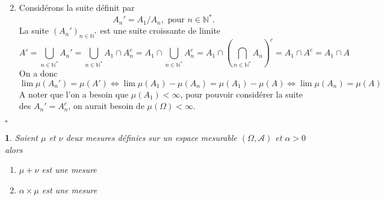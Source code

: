 \documentclass[8pt,notheorems]{beamer}
\newtheorem{prop}{\translate{Proposition}}
\theoremstyle{definition}
\theoremstyle{example}
\theoremstyle{mystyle}
\theoremstyle{plain}
\begin{document}
\begin{frame}[allowframebreaks]
\begin{enumerate}
$$$$
\item Considérons la suite définit par 
$$
A_n' = A_1 / A_n,\text{ pour }n\in \mathbb{N}^\ast.
$$
La suite $(A_n')_{n\in\mathbb{N}^\ast}$ est une suite croissante de limite
$$
A' = \bigcup_{n\in \mathbb{N}^\ast}A_n' = \bigcup_{n\in \mathbb{N}^\ast}A_1\cap A_n^c = A_1\cap\bigcup_{n\in \mathbb{N}^\ast} A_n^c = A_1\cap \left(\bigcap_{n\in \mathbb{N}^\ast} A_n\right)^c=A_1\cap A^c = A_1\cap A
$$
On a donc 
\begin{equation*}
\lim \mu(A_n') = \mu(A') \Leftrightarrow \lim \mu(A_1)-\mu(A_n) = \mu(A_1) - \mu(A)\Leftrightarrow \lim \mu(A_n) = \mu(A) 
\end{equation*}
A noter que l'on a besoin que $\mu(A_1) <\infty$, pour pouvoir considérer la suite des $A_n' = A_n^c$, on aurait besoin de $\mu(\Omega)<\infty$.
\end{enumerate}
\flushright$\square$
\end{frame}
\begin{frame}
\begin{prop}
Soient $\mu$ et $\nu$ deux mesures définies sur un espace mesurable $(\Omega, \mathcal{A})$ et $\alpha>0$ alors 
\begin{enumerate}
    \item $\mu+\nu$ est une mesure
    \item$\alpha\times\mu$ est une mesure
\end{enumerate}
\end{prop}
\end{frame}
\end{document}
